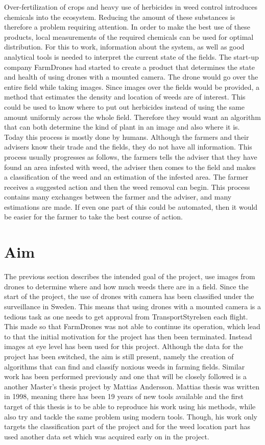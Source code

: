 Over-fertilization of crops and heavy use of herbicides in weed control introduces chemicals into the ecosystem. Reducing the amount of these substances is therefore a problem requiring attention. In order to make the best use of these products, local measurements of the required chemicals can be used for optimal distribution. For this to work, information about the system, as well as good analytical tools is needed to interpret the current state of the fields.
The start-up company FarmDrones had started to create a product that determines the state and health of using drones with a mounted camera. The drone would go over the entire field while taking images. Since images over the fields would be provided, a method that estimates the density and location of weeds are of interest. This could be used to know where to put out herbicides instead of using the same amount uniformly  across the whole field. Therefore they would want an algorithm that can both determine the kind of plant in an image and also where it is. Today this process is mostly done by humans. Although the farmers and their advisers know their trade and the fields, they do not have all information. This process usually progresses as follows, the farmers tells the adviser that they have found an area infested with weed, the adviser then comes to the field and makes a classification of the weed and an estimation of the infested area. The farmer receives a suggested action and then the weed removal can begin. This process contains many exchanges between the farmer and the adviser, and many estimations are made. If even one part of this could be automated, then it would be easier for the farmer to take the best course of action.

\section{Aim}

The previous section describes the intended goal of the project, use images from drones to determine where and how much weeds there are in a field. Since the start of the project, the use of drones with camera has been classified under the surveillance in Sweden. This means that using drones with a mounted camera is a tedious task as one needs to get approval from TransportStyrelsen each flight. This made so that FarmDrones was not able to continue its operation, which lead to that the initial motivation for the project has then been terminated. Instead images at eye level has been used for this project. Although the data for the project has been switched, the aim is still present, namely the creation of algorithms that can find and classify noxious weeds in farming fields. Similar work has been performed previously and one that will be closely followed is a another Master's thesis project by Mattias Andersson\cite{WeedClassification}. Mattias thesis was written in 1998, meaning there has been 19 years of new tools available and the first target of this thesis is to be able to reproduce his work using his methods, while also try and tackle the same problem using modern tools. Though, his work only targets the classification part of the project and for the weed location part has used another data set which was acquired early on in the project.

